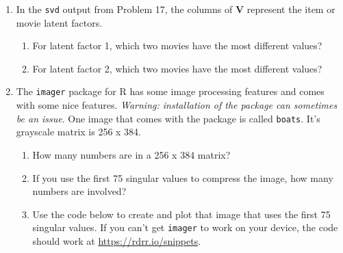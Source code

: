 \documentclass[
]{book}
\providecommand{\tightlist}{%
  \setlength{\itemsep}{0pt}\setlength{\parskip}{0pt}}
\theoremstyle{definition}
\theoremstyle{definition}
\theoremstyle{definition}
\theoremstyle{definition}
\theoremstyle{remark}
\begin{document}
\begin{enumerate}
\def\labelenumi{\arabic{enumi}.}
\setcounter{enumi}{17}
\tightlist
\item
  In the \texttt{svd} output from Problem 17, the columns of \(\mathbf{V}\) represent the item or movie latent factors.

  \begin{enumerate}
  \def\labelenumii{\alph{enumii}.}
  \tightlist
  \item
    For latent factor 1, which two movies have the most different values?
  \item
    For latent factor 2, which two movies have the most different values?
  \end{enumerate}
\item
  The \texttt{imager} package for R has some image processing features and comes with some nice features. \emph{Warning: installation of the package can sometimes be an issue}. One image that comes with the package is called \texttt{boats}. It's grayscale matrix is 256 x 384.

  \begin{enumerate}
  \def\labelenumii{\alph{enumii}.}
  \tightlist
  \item
    How many numbers are in a 256 x 384 matrix?
  \item
    If you use the first 75 singular values to compress the image, how many numbers are involved?
  \item
    Use the code below to create and plot that image that uses the first 75 singular values. If you can't get \texttt{imager} to work on your device, the code should work at \url{https://rdrr.io/snippets}.
  \end{enumerate}
\end{enumerate}
\end{document}
